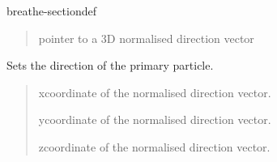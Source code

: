 \documentclass[letterpaper,10pt,english]{sphinxmanual}
\begin{document}
\begin{fulllineitems}
\begin{sphinxuseclass}{breathe-sectiondef}
\begin{fulllineitems}
\sphinxAtStartPar
\begin{quote}\begin{description}
\sphinxAtStartPar
\sphinxstylestrong{{[}in{]}} pointer to a 3D normalised direction vector 

\end{description}\end{quote}


\end{fulllineitems}


\begin{fulllineitems}
\label{\detokenize{Simulation/SimulationCodeDoc:_CPPv4N16PrimaryGenerator12SetDirectionEddd}}
\pysigstartsignatures
\pysigstartmultiline
{}
\pysigstopmultiline
\pysigstopsignatures
\sphinxAtStartPar
Sets the direction of the primary particle. 

\sphinxAtStartPar
\begin{quote}\begin{description}
\sphinxAtStartPar
\sphinxstylestrong{{[}in{]}} x\sphinxhyphen{}coordinate of the normalised direction vector. 

\sphinxAtStartPar
\sphinxstylestrong{{[}in{]}} y\sphinxhyphen{}coordinate of the normalised direction vector. 

\sphinxAtStartPar
\sphinxstylestrong{{[}in{]}} z\sphinxhyphen{}coordinate of the normalised direction vector. 

\end{description}\end{quote}


\end{fulllineitems}



\end{sphinxuseclass}
\end{fulllineitems}
\end{document}
